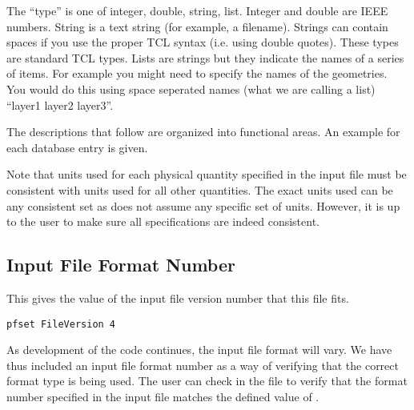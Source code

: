 \vspace{0.25in}
The ``type'' is one of integer, double, string, list.  Integer and double are
IEEE numbers.  String is a text string (for example, a filename).
Strings can contain spaces if you use the proper TCL syntax
(i.e. using double quotes).  These types are standard TCL
types.  Lists are strings but they indicate the names of a series of items.
For example you might need to specify the names of the geometries. You
would do this using space seperated names (what we are calling a list)
``layer1 layer2 layer3''.

The descriptions that follow are organized into functional areas.  An
example for each database entry is given.

Note that units used for each physical quantity specified in the input file
must be consistent with units used for all other quantities.  The exact units
used can be any consistent set as \parflow{} does not assume any specific set
of units.  However, it is up to the user to make sure all specifications are
indeed consistent.


\subsection{Input File Format Number}
\label{Input File Format Number}

{This gives the value of
the input file version number that this file fits.}
\begin{display}\begin{verbatim} 
pfset FileVersion 4
\end{verbatim}\end{display} 

As development of the \parflow{} code continues, the input file format
will vary.  We have thus included an input file format number as a way
of verifying that the correct format type is being used.  The user can
check in the  file to verify that
the format number specified in the input file matches the defined
value of . 


